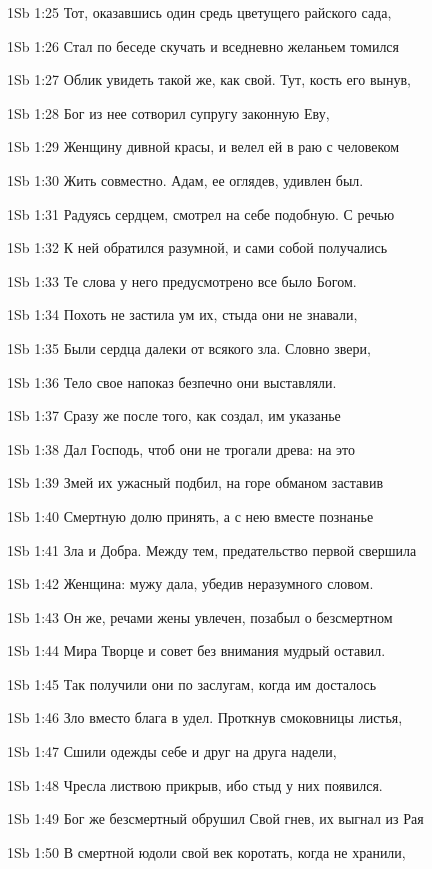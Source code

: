 \vs 1Sb 1:25 Тот, оказавшись один средь цветущего райского сада,

\vs 1Sb 1:26 Стал по беседе скучать и вседневно желаньем томился

\vs 1Sb 1:27 Облик увидеть такой же, как свой. Тут, кость его вынув,

\vs 1Sb 1:28 Бог из нее сотворил супругу законную  Еву,

\vs 1Sb 1:29 Женщину дивной красы, и велел ей в раю с человеком

\vs 1Sb 1:30 Жить совместно. Адам, ее оглядев, удивлен был.

\vs 1Sb 1:31 Радуясь сердцем, смотрел на себе подобную. С речью

\vs 1Sb 1:32 К ней обратился разумной, и сами собой получались

\vs 1Sb 1:33 Те слова у него  предусмотрено все было Богом.

\vs 1Sb 1:34 Похоть не застила ум их, стыда они не знавали,

\vs 1Sb 1:35 Были сердца далеки от всякого зла. Словно звери,

\vs 1Sb 1:36 Тело свое напоказ безпечно они выставляли.

\vs 1Sb 1:37 Сразу же после того, как создал, им указанье

\vs 1Sb 1:38 Дал Господь, чтоб они не трогали древа: на это

\vs 1Sb 1:39 Змей их ужасный подбил, на горе обманом заставив

\vs 1Sb 1:40 Смертную долю принять, а с нею вместе  познанье

\vs 1Sb 1:41 Зла и Добра. Между тем, предательство первой свершила

\vs 1Sb 1:42 Женщина: мужу дала, убедив неразумного словом.

\vs 1Sb 1:43 Он же, речами жены увлечен, позабыл о безсмертном

\vs 1Sb 1:44 Мира Творце и совет без внимания мудрый оставил.

\vs 1Sb 1:45 Так получили они по заслугам, когда им досталось

\vs 1Sb 1:46 Зло вместо блага в удел. Проткнув смоковницы листья,

\vs 1Sb 1:47 Сшили одежды себе и друг на друга надели,

\vs 1Sb 1:48 Чресла листвою прикрыв, ибо стыд у них появился.

\vs 1Sb 1:49 Бог же безсмертный обрушил Свой гнев, их выгнал из Рая

\vs 1Sb 1:50 В смертной юдоли свой век коротать, когда не хранили,

